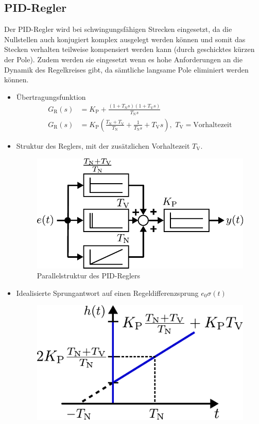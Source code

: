 \subsection{PID-Regler}
%
Der PID-Regler wird bei schwingungsfähigen Strecken eingesetzt, da die Nullstellen auch konjugiert komplex ausgelegt werden können und somit das Stecken verhalten teilweise kompensiert werden kann (durch geschicktes kürzen der Pole). Zudem werden sie eingesetzt wenn es hohe Anforderungen an die Dynamik des Regelkreises gibt, da sämtliche langsame Pole eliminiert werden können. 
%
\begin{itemize}
	\item Übertragungsfunktion
	\begin{equation*}
	\begin{aligned}
	G_{\text{R}}(s)&=K_{\text{P}}+\frac{\left(1+T_{\text{N}}s\right)\left(1+T_{\text{V}}s\right)}{T_{\text{N}}s}\\
	G_{\text{R}}(s)&=K_{\text{P}}\left(\frac{T_{\text{N}}+T_{\text{V}}}{T_{\text{N}}}+\frac{1}{T_{\text{N}}s}+T_{\text{V}}s\right),\,\, T_{\text{V}}=\text{Vorhaltezeit}
	\end{aligned}
	\end{equation*}
	\item Struktur des Reglers, mit der zusätzlichen Vorhaltezeit $T_{\text{V}}$.
	\begin{figure}[h]
		\centering
		\includegraphics[width=0.55\linewidth]{Abbildungen/Reglerentwurf/PDF/PIDReglerStruktur.pdf}
		\caption{Parallelstruktur des PID-Reglers}
	\end{figure}
	\item Idealisierte Sprungantwort auf einen Regeldifferenzsprung $e_{0}\sigma(t)$
	\begin{figure}[h]
		\centering
		\includegraphics[width=0.45\linewidth]{Abbildungen/Reglerentwurf/PDF/PIDReglerSprung.pdf}

\end{figure}
\end{itemize}
